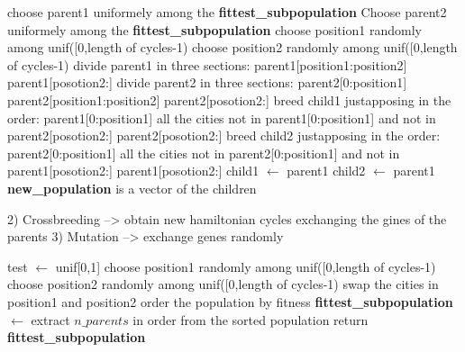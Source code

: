 \documentclass{article}
\begin{document}
\begin{algorithm}[H]
    \begin{algorithmic}[1]
  			\State choose parent1 uniformely among the \textbf{fittest\_subpopulation}
  			\State Choose parent2 uniformely among the \textbf{fittest\_subpopulation}
  				\State choose position1 randomly among unif([0,length of cycles-1)
  				\State choose position2 randomly among unif([0,length of cycles-1)
  				\State divide parent1 in three sections: 
  				\State parent1[position1:position2]
  				\State parent1[posotion2:]
  				\State divide parent2 in three sections:
  				\State parent2[0:position1] 
  				\State parent2[position1:position2]
  				\State parent2[posotion2:]
  				\State breed child1 justapposing in the order:
  				\State parent1[0:position1]
  				\State all the cities not in  parent1[0:position1] and not in parent2[posotion2:]
  				\State parent2[posotion2:]
  				\State breed child2 justapposing in the order:
  				\State parent2[0:position1]
  				\State all the cities not in  parent2[0:position1] and not in parent1[posotion2:]
  				\State parent1[posotion2:]
  			\Else
  				\State child1 $\leftarrow$ parent1
  				\State child2 $\leftarrow$ parent1
  			\EndIf
      	\EndFor
        \State \textbf{new\_population} is a vector of the children 
       \EndFunction
\end{algorithmic}
\end{algorithm}
2) Crossbreeding --> obtain new hamiltonian cycles exchanging the gines of the parents
3) Mutation --> exchange genes randomly
\begin{algorithm}[H]
    \begin{algorithmic}[1]
        \State test $\leftarrow$ unif[0,1]
        	\State choose position1 randomly among unif([0,length of cycles-1)
  			\State choose position2 randomly among unif([0,length of cycles-1)
  			\State swap the cities in position1 and position2
        \EndIf
        \State order the population by fitness
        \State \textbf{fittest\_subpopulation} $\leftarrow$ extract $n\_parents$ in order from the sorted population
        \State return \textbf{fittest\_subpopulation}
       \EndFunction
\end{algorithmic}
\end{algorithm}
\end{document}
